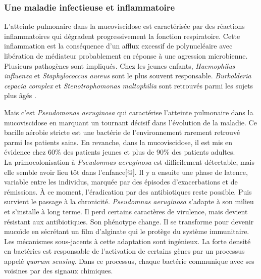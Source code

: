 \documentclass[12pt,a4paper]{article}
\begin{document}
\subsubsection{Une maladie infectieuse et inflammatoire}

L’atteinte pulmonaire dans la mucoviscidose est caractérisée par des réactions inflammatoires qui dégradent progressivement la fonction respiratoire. Cette inflammation est la conséquence d'un afflux excessif de polynucléaire avec libération de médiateur\cite{Heijerman2005} probablement en réponse à une agression microbienne. Plusieurs pathogènes sont impliqués. Chez les jeunes enfants\cite{Davies}, \textit{Haemophilus influenza} et \textit{Staphylococcus aureus} sont le plus souvent responsable. \textit{Burkolderia cepacia complex} et \textit{Stenotrophomonas maltophilia} sont retrouvés parmi les sujets plus âgés \cite{Davies}.

Mais c’est \textit{Pseudomonas aeruginosa} qui caractérise l’atteinte pulmonaire dans la mucoviscidose en marquant un tournant décisif dans l’évolution de la maladie. Ce bacille aérobie stricte est une bactérie de l'environnement rarement retrouvé parmi les patients sains\cite{Plesiat}. En revanche, dans la mucoviscidose, il est mis en évidence\cite{LeBourgeois}  chez 60\% des patients jeunes et plus de 90\% des patients adultes.\\
La primocolonisation à \textit{Pseudomnas aeruginosa} est difficilement détectable, mais elle semble avoir lieu tôt dans l’enfance[@]. Il y a ensuite une phase de latence, variable entre les individus, marquée par des épisodes d’exacerbations et de rémissions. À ce moment, l’éradication par des antibiotiques reste possible.
Puis survient le passage à la chronicité. \textit{Pseudomnas aeruginosa} s'adapte à son milieu et s’installe à long terme. Il perd certains caractères de virulence, mais devient résistant aux antibiotiques\cite{LeBourgeois}. Son phénotype change. Il se transforme pour devenir mucoïde en sécrétant un film d’alginate qui le protège du système immunitaire. Les mécanismes sous-jacents à cette adaptation sont ingénieux. La forte densité en bactéries est responsable de l’activation de certains gènes par un processus appelé \textit{quorum sensing}\cite{Ruimy2004}. Dans ce processus, chaque bactérie communique avec ses voisines par des signaux chimiques.
\end{document}
